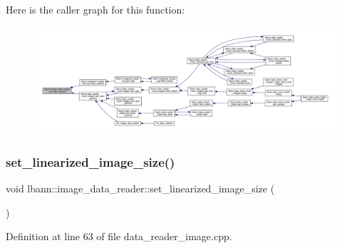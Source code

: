 Here is the caller graph for this function\+:\nopagebreak
\begin{figure}[H]
\begin{center}
\leavevmode
\includegraphics[width=350pt]{classlbann_1_1image__data__reader_a6ed9b8b12ad3ffa93ad458d872f8c044_icgraph}
\end{center}
\end{figure}
\mbox{\label{classlbann_1_1image__data__reader_a0164b0e3abbe92daef73b36fb925403e}} 
\subsubsection{\texorpdfstring{set\+\_\+linearized\+\_\+image\+\_\+size()}{set\_linearized\_image\_size()}}
{\footnotesize\ttfamily void lbann\+::image\+\_\+data\+\_\+reader\+::set\+\_\+linearized\+\_\+image\+\_\+size (\begin{DoxyParamCaption}{ }\end{DoxyParamCaption})\hspace{0.3cm}{\ttfamily [protected]}}



Definition at line 63 of file data\+\_\+reader\+\_\+image.\+cpp.


